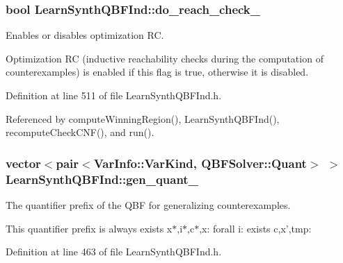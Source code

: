 \hypertarget{classLearnSynthQBFInd_af87e4a2c1d17c4c5bc398082d6d3e365}{
\subsubsection[{do\-\_\-reach\-\_\-check\-\_\-}]{\setlength{\rightskip}{0pt plus 5cm}bool Learn\-Synth\-Q\-B\-F\-Ind\-::do\-\_\-reach\-\_\-check\-\_\-\hspace{0.3cm}{\ttfamily [protected]}}}\label{classLearnSynthQBFInd_af87e4a2c1d17c4c5bc398082d6d3e365}


Enables or disables optimization R\-C. 

Optimization R\-C (inductive reachability checks during the computation of counterexamples) is enabled if this flag is true, otherwise it is disabled. 

Definition at line 511 of file Learn\-Synth\-Q\-B\-F\-Ind.\-h.



Referenced by compute\-Winning\-Region(), Learn\-Synth\-Q\-B\-F\-Ind(), recompute\-Check\-C\-N\-F(), and run().

\hypertarget{classLearnSynthQBFInd_a1a20b68cc735e4bbc0cc7030329acb4d}{
\subsubsection[{gen\-\_\-quant\-\_\-}]{\setlength{\rightskip}{0pt plus 5cm}vector$<$pair$<${\bf Var\-Info\-::\-Var\-Kind}, {\bf Q\-B\-F\-Solver\-::\-Quant}$>$ $>$ Learn\-Synth\-Q\-B\-F\-Ind\-::gen\-\_\-quant\-\_\-\hspace{0.3cm}{\ttfamily [protected]}}}\label{classLearnSynthQBFInd_a1a20b68cc735e4bbc0cc7030329acb4d}


The quantifier prefix of the Q\-B\-F for generalizing counterexamples. 

This quantifier prefix is always exists x$\ast$,i$\ast$,c$\ast$,x\-: forall i\-: exists c,x',tmp\-: 

Definition at line 463 of file Learn\-Synth\-Q\-B\-F\-Ind.\-h.



